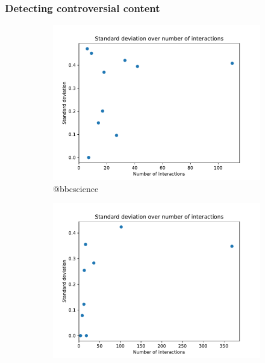 \documentclass{beamer}
\begin{document}
\begin{frame}[c]
    \frametitle{Detecting controversial content}
    \begin{figure}
        \begin{center}
            \begin{subfigure}[b]{0.4\textwidth}
                \centering
                \includegraphics[width=\textwidth]{out/bbcscience200/std-dev-n-interactions.pdf}
                \caption{@bbcscience}
                \label{fig:out/bbctech200/std-dev-n-interactions.pdf}
            \end{subfigure}
            \begin{subfigure}[b]{0.4\textwidth}
                \centering
                \includegraphics[width=\textwidth]{out/bbctech200/std-dev-n-interactions.pdf}

\end{subfigure}
\end{center}
\end{figure}
\end{frame}
\end{document}
